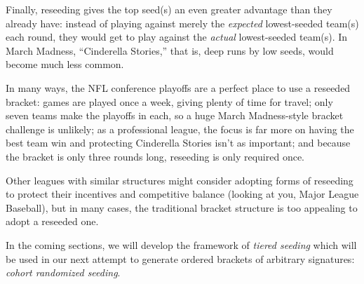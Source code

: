 {Finally, reseeding gives the top seed(s) an even greater advantage than they already have: instead of playing against merely the \textit{expected} lowest-seeded team(s) each round, they would get to play against the \textit{actual} lowest-seeded team(s). In March Madness, ``Cinderella Stories,'' that is, deep runs by low seeds, would become much less common.

In many ways, the NFL conference playoffs are a perfect place to use a reseeded bracket: games are played once a week, giving plenty of time for travel; only seven teams make the playoffs in each, so a huge March Madness-style bracket challenge is unlikely; as a professional league, the focus is far more on having the best team win and protecting Cinderella Stories isn't as important; and because the bracket is only three rounds long, reseeding is only required once.

Other leagues with similar structures might consider adopting forms of reseeding to protect their incentives and competitive balance (looking at you, Major League Baseball), but in many cases, the traditional bracket structure is too appealing to adopt a reseeded one.

In the coming sections, we will develop the framework of \textit{tiered seeding} which will be used in our next attempt to generate ordered brackets of arbitrary signatures: \textit{cohort randomized seeding}.
}